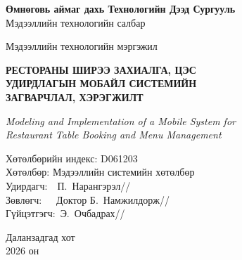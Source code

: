 \begin{titlepage}
\pagestyle{empty}
\centering

{\large\bfseries Өмнөговь аймаг дахь Технологийн Дээд Сургууль}\\[6pt]
{\large Мэдээллийн технологийн салбар}

\vspace{0.5cm}
\begin{flushright}
{\normalsize Мэдээллийн технологийн мэргэжил}
\end{flushright}

\vspace{1.5cm}
{\LARGE\bfseries РЕСТОРАНЫ ШИРЭЭ ЗАХИАЛГА, ЦЭС}\\[8pt]
{\LARGE\bfseries УДИРДЛАГЫН МОБАЙЛ СИСТЕМИЙН}\\[8pt]
{\LARGE\bfseries ЗАГВАРЧЛАЛ, ХЭРЭГЖИЛТ}

\vspace{1cm}
\begin{center}
{\normalsize\itshape Modeling and Implementation of a Mobile System for}\\[4pt]
{\normalsize\itshape Restaurant Table Booking and Menu Management}
\end{center}

\vspace{1cm}

\begin{flushleft}
{\normalsize Хөтөлбөрийн индекс:} {\normalsize D061203}\\[4pt]
{\normalsize Хөтөлбөр:} {\normalsize Мэдээллийн системийн хөтөлбөр}\\[24pt]

{\normalsize Удирдагч:~~П.~Нарангэрэл\hfill/\underline{\hspace{4cm}}/}\\[10pt]
{\normalsize Зөвлөгч:~~~Доктор Б.~Намжилдорж\hfill/\underline{\hspace{4cm}}/}\\[10pt]
{\normalsize Гүйцэтгэгч:~Э.~Очбадрах\hfill/\underline{\hspace{4cm}}/}
\end{flushleft}

\vfill
\begin{center}
{\large Даланзадгад хот}\\[4pt]
{\large 2026 он}
\end{center}
\end{titlepage}
\clearpage

